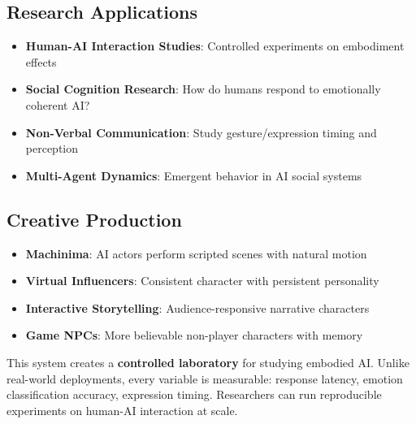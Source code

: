\documentclass[11pt,letterpaper]{article}
\begin{document}
\subsection{Research Applications}

\begin{itemize}
  \item \textbf{Human-AI Interaction Studies}: Controlled experiments on embodiment effects
  \item \textbf{Social Cognition Research}: How do humans respond to emotionally coherent AI?
  \item \textbf{Non-Verbal Communication}: Study gesture/expression timing and perception
  \item \textbf{Multi-Agent Dynamics}: Emergent behavior in AI social systems
\end{itemize}

\subsection{Creative Production}

\begin{itemize}
  \item \textbf{Machinima}: AI actors perform scripted scenes with natural motion
  \item \textbf{Virtual Influencers}: Consistent character with persistent personality
  \item \textbf{Interactive Storytelling}: Audience-responsive narrative characters
  \item \textbf{Game NPCs}: More believable non-player characters with memory
\end{itemize}

\begin{keybox}
This system creates a \textbf{controlled laboratory} for studying embodied AI. Unlike real-world deployments, every variable is measurable: response latency, emotion classification accuracy, expression timing. Researchers can run reproducible experiments on human-AI interaction at scale.
\end{keybox}
\end{document}
